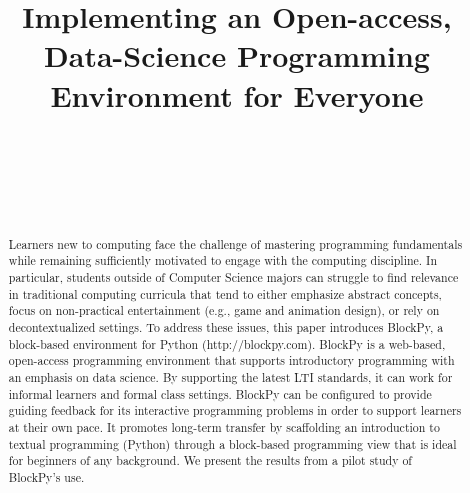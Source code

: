 \documentclass{sig-alternate}
\begin{document}
\title{Implementing an Open-access, Data-Science Programming Environment for Everyone}
\author{
	\\
	\\
	 \\
	  \\
}

\maketitle
\begin{abstract}
 Learners new to computing face the challenge of mastering programming fundamentals while remaining sufficiently motivated to engage with the computing discipline.
In particular, students outside of Computer Science majors can struggle to find relevance in traditional computing curricula that tend to either emphasize abstract concepts, focus on non-practical entertainment (e.g., game and animation design), or rely on decontextualized settings.
To address these issues, this paper introduces BlockPy, a block-based environment for Python (http://blockpy.com). BlockPy is a web-based, open-access programming environment that supports introductory programming with an emphasis on data science.
By supporting the latest LTI standards, it can work for informal learners and formal class settings.
BlockPy can be configured to provide guiding feedback for its interactive programming problems in order to support learners at their own pace.
It promotes long-term transfer by scaffolding an introduction to textual programming (Python) through a block-based programming view that is ideal for beginners of any background.
We present the results from a pilot study of BlockPy's use.
\end{abstract}



\end{document}
